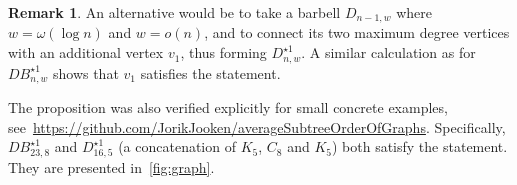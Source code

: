 \documentclass[11pt]{article}
\theoremstyle{definition}
\newtheorem{remark}[thr]{Remark}
\begin{document}
 \begin{remark}
      An alternative would be to take a barbell $D_{n-1,w}$ where $w=\omega(\log n)$ and $w=o(n)$, and to connect its two maximum degree vertices with an additional vertex $v_1$, thus forming $D_{n,w}^{\star 1}$. A similar calculation as for $DB^{\star 1}_{n,w}$ shows that $v_1$ satisfies the statement.
      
      The proposition was also verified explicitly for small concrete examples, see~\url{https://github.com/JorikJooken/averageSubtreeOrderOfGraphs}. Specifically, $DB^{\star 1}_{23,8}$ and $D^{\star 1}_{16,5}$ (a concatenation of $K_5$, $C_8$ and $K_5$) both satisfy the statement. They are presented in~\cref{fig:graph}.
 \end{remark}
\end{document}
